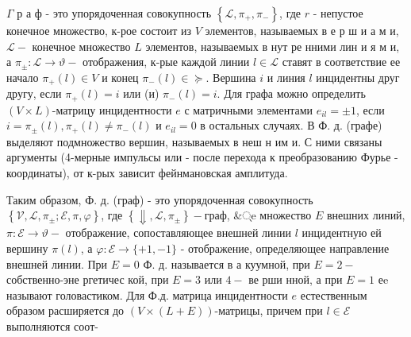 \documentclass[10pt]{article}
\begin{document}
$\Gamma$ р а $ф$ - это упорядоченная совокупность $\left\{\mathscr{L}, \pi_{+}, \pi_{-}\right\}$, где $r$ - непустое конечное множество, к-рое состоит из $V$ элементов, называемых в е р ш и а м и, $\mathscr{L}-$ конечное множество $L$ элементов, называемых в нут ре нними лин и я м и, а $\pi_{ \pm}: \mathscr{L} \rightarrow \vartheta-$ отображения, к-рые каждой линии $l \in \mathscr{L}$ ставят в соответствие ее начало $\pi_{+}(l) \in V$ и конец $\pi_{-}(l) \in \succcurlyeq$. Вершина $i$ и линия $l$ инцидентны друг другу, если $\pi_{+}(l)=i$ или (и) $\pi_{-}(l)=i$. Для графа можно определить $(V \times L)$-матрицу инцидентности $e$ с матричными элементами $e_{i l}= \pm 1$, если $i=\pi_{ \pm}(l), \pi_{+}(l) \neq \pi_{-}(l)$ и $e_{i l}=0$ в остальных случаях. В Ф. д. (графе) выделяют подмножество вершин, называемых в неш н им и. С ними связаны аргументы (4-мерные импульсы или - после перехода к преобразованию Фурье - координаты), от к-рых зависит фейнмановская амплитуда.



Таким образом, Ф. д. (граф) - это упорядоченная совокупность $\left\{\mathscr{V}, \mathscr{L}, \pi_{ \pm} ; \mathscr{E}, \pi, \varphi\right\}$, где $\left\{\Downarrow, \mathscr{L}, \pi_{ \pm}\right\}-$граф, \&्e множество $E$ внешних линий, $\pi: \mathscr{E} \rightarrow \vartheta-$ отображение, сопоставляющее внешней линии $l$ инцидентную ей вершину $\pi(l)$, а $\varphi: \mathscr{E} \rightarrow\{+1,-1\}$ - отображение, определяющее направление внешней линии. При $E=0$ Ф. д. называется в а куумной, при $E=2-$ собственно-эне ргетичес кой, при $E=3$ или $4-$ ве рши нной, а при $E=1$ еe называют головастиком. Для Ф.д. матрица инцидентности $e$ естественным образом расширяется до $(V \times(L+E))$-матрицы, причем при $l \in \mathscr{E}$ выполняются соот-
\end{document}
